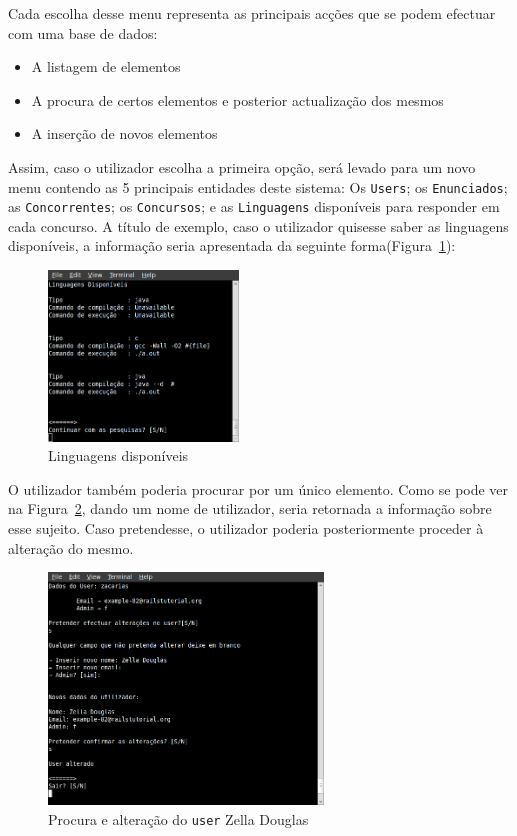 Cada escolha desse menu representa as principais acções que se podem efectuar com uma base de dados: 

\begin{itemize}
 \item A listagem de elementos
 \item A procura de certos elementos e posterior actualização dos mesmos
 \item A inserção de novos elementos
\end{itemize}

Assim, caso o utilizador escolha a primeira opção, será levado para um novo menu contendo as 5 principais entidades deste sistema: Os \texttt{Users}; os \texttt{Enunciados}; as \texttt{Concorrentes}; os \texttt{Concursos}; e as \texttt{Linguagens} disponíveis para responder em cada concurso. A título de exemplo, caso o utilizador quisesse saber 
as linguagens disponíveis, a informação seria apresentada da seguinte forma(Figura~\ref{img:linguagens}):\\

\begin{figure}[H]
\begin{center}
\includegraphics[width=0.45\textwidth]{Images/linguagens}
\caption{Linguagens disponíveis}\label{img:linguagens}
\end{center}
\end{figure} 

O utilizador também poderia procurar por um único elemento. Como se pode ver na Figura~\ref{img:zelladouglas}, dando um nome de utilizador, 
seria retornada a informação sobre esse sujeito. Caso pretendesse, o utilizador poderia posteriormente proceder à alteração do mesmo.\\

\begin{figure}[H]
\begin{center}
\includegraphics[width=0.65\textwidth]{Images/zacarias}
\caption{Procura e alteração do \texttt{user} Zella Douglas}\label{img:zelladouglas}
\end{center}
\end{figure} 

